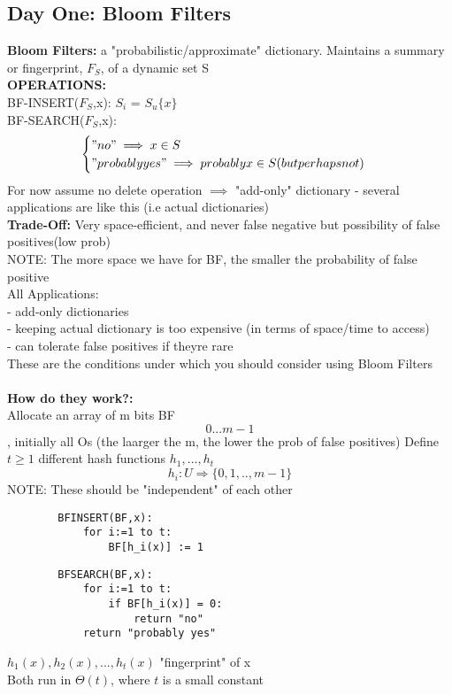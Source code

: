 \documentclass{article}
\begin{document}
	\subsection{Day One: Bloom Filters}
	\textbf{Bloom Filters:} a "probabilistic/approximate" dictionary. Maintains a summary or fingerprint, $F_S$, of a dynamic set S\\
	\textbf{OPERATIONS:}\\
	BF-INSERT($F_S$,x): $S_i$ = $S_u\{x\}$\\
	BF-SEARCH($F_S$,x): \[ \begin{cases} 
	"no" \implies x\in S\\
	"probably yes" \implies probably x\in S (but perhaps not)\\
	\end{cases}
	\]
	For now assume no delete operation $\implies$ "add-only" dictionary - several applications are like this (i.e actual dictionaries)\\
	\textbf{Trade-Off:} Very space-efficient, and never false negative but possibility of false positives(low prob)\\
	NOTE: The more space we have for BF, the smaller the probability of false positive\\
	All Applications:\\
	- add-only dictionaries\\
	- keeping actual dictionary is too expensive (in terms of space/time to access)\\
	- can tolerate false positives if theyre rare\\
	These are the conditions under which you should consider using Bloom Filters\\\\
	\textbf{How do they work?:}\\
	Allocate an array of m bits BF\[0...m-1\], initially all Os (the laarger the m, the lower the prob of false positives) Define $t\ge 1$ different hash functions $h_1,...,h_t$
	$$h_i: U \Rightarrow \{0,1,..,m-1\}$$
	NOTE: These should be "independent" of each other
	\begin{lstlisting}
		BFINSERT(BF,x):
			for i:=1 to t:
				BF[h_i(x)] := 1
	\end{lstlisting}
	\begin{lstlisting}
		BFSEARCH(BF,x):
			for i:=1 to t:
				if BF[h_i(x)] = 0:
					return "no"
			return "probably yes"
	\end{lstlisting}
	$h_1(x), h_2(x), ..., h_t(x)$ "fingerprint" of x \\
	Both run in $\Theta(t)$, where $t$ is a small constant\\\\
\end{document}
